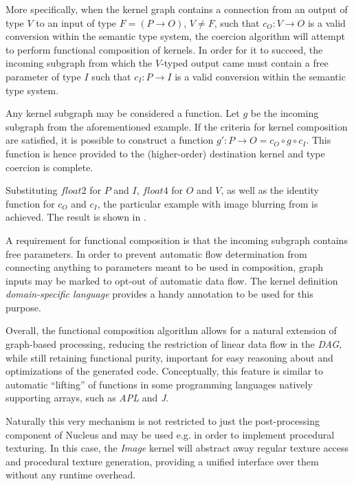 More specifically, when the kernel graph contains a connection from an output of type $V$ to an input of type $F = (P \rightarrow O)$, $V \neq F$, such that $c_O : V \rightarrow O$ is a valid conversion within the semantic type system, the coercion algorithm will attempt to perform functional composition of kernels. In order for it to succeed, the incoming subgraph from which the $V$-typed output came must contain a free parameter of type $I$ such that $c_I : P \rightarrow I$ is a valid conversion within the semantic type system.

Any kernel subgraph may be considered a function. Let $g$ be the incoming subgraph from the aforementioned example. If the criteria for kernel composition are satisfied, it is possible to construct a function $g\prime : P \rightarrow O = c_O \circ g \circ c_I$. This function is hence provided to the (higher-order) destination kernel and type coercion is complete.

Substituting $float2$ for $P$ and $I$, $float4$ for $O$ and $V$, as well as the identity function for $c_O$ and $c_I$, the particular example with image blurring from  is achieved. The result is shown in .

A requirement for functional composition is that the incoming subgraph contains free parameters. In order to prevent automatic flow determination from connecting anything to parameters meant to be used in composition, graph inputs may be marked to opt-out of automatic data flow. The kernel definition \emph{domain-specific language} provides a handy annotation to be used for this purpose.

Overall, the functional composition algorithm allows for a natural extension of graph-based processing, reducing the restriction of linear data flow in the \emph{DAG}, while still retaining functional purity, important for easy reasoning about and optimizations of the generated code. Conceptually, this feature is similar to automatic ``lifting'' of functions in some programming languages natively supporting arrays, such as \emph{APL} and \emph{J}.

Naturally this very mechanism is not restricted to just the post-processing component of Nucleus and may be used e.g. in order to implement procedural texturing. In this case, the \emph{Image} kernel will abstract away regular texture access and procedural texture generation, providing a unified interface over them without any runtime overhead.
	
